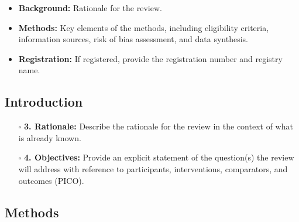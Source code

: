 \documentclass[11pt]{article}
\def\tightlist{}
\begin{document}
\begin{Form}
\begin{itemize}
  \begin{itemize}
  \tightlist
  \item
    \textbf{Background:} Rationale for the review.
  \item
    \textbf{Methods:} Key elements of the methods, including eligibility
    criteria, information sources, risk of bias assessment, and data
    synthesis.
  \item
    \textbf{Registration:} If registered, provide the registration
    number and registry name.
  \end{itemize}
\end{itemize}

\subsection{Introduction}\label{introduction}

\begin{itemize}
\tightlist
\item[$\square$]
  \textbf{3. Rationale:} Describe the rationale for the review in the
  context of what is already known.
\item[$\square$]
  \textbf{4. Objectives:} Provide an explicit statement of the
  question(s) the review will address with reference to participants,
  interventions, comparators, and outcomes (PICO).
\end{itemize}

\subsection{Methods}\label{methods}


\end{Form}
\end{document}
